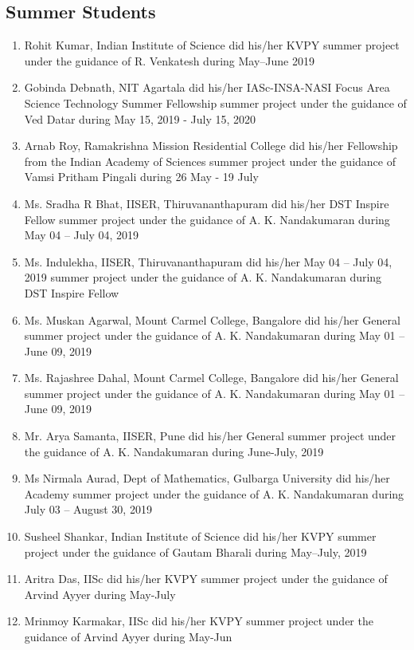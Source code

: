

\subsection{Summer Students}

\begin{enumerate}
\item Rohit Kumar, Indian Institute of Science did his/her KVPY summer project under the guidance of R. Venkatesh during May–June 2019
\item Gobinda Debnath, NIT Agartala did his/her IASc-INSA-NASI Focus Area Science Technology Summer Fellowship summer project under the guidance of Ved Datar during May 15, 2019 - July 15, 2020
\item Arnab Roy, Ramakrishna Mission Residential College did his/her Fellowship from the Indian Academy of Sciences summer project under the guidance of Vamsi Pritham Pingali during 26 May - 19 July
\item Ms. Sradha R Bhat, IISER, Thiruvananthapuram did his/her DST Inspire Fellow summer project under the guidance of A. K. Nandakumaran during May 04 – July 04, 2019
\item Ms. Indulekha, IISER, Thiruvananthapuram did his/her May 04 – July 04, 2019 summer project under the guidance of A. K. Nandakumaran during DST Inspire Fellow
\item Ms. Muskan Agarwal, Mount Carmel College, Bangalore did his/her General summer project under the guidance of A. K. Nandakumaran during May 01 – June 09, 2019
\item Ms. Rajashree Dahal, Mount Carmel College, Bangalore did his/her General summer project under the guidance of A. K. Nandakumaran during May 01 – June 09, 2019
\item Mr. Arya Samanta, IISER, Pune did his/her General summer project under the guidance of A. K. Nandakumaran during June-July, 2019
\item Ms Nirmala Aurad, Dept of Mathematics, Gulbarga University did his/her Academy summer project under the guidance of A. K. Nandakumaran during July 03 – August 30, 2019
\item Susheel Shankar, Indian Institute of Science did his/her KVPY summer project under the guidance of Gautam Bharali during May--July, 2019
\item Aritra Das, IISc did his/her KVPY summer project under the guidance of Arvind Ayyer during May-July
\item Mrinmoy Karmakar, IISc did his/her KVPY summer project under the guidance of Arvind Ayyer during May-Jun

\end{enumerate}

